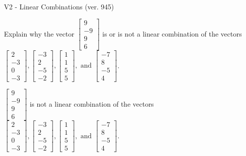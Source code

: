 \begin{exercise}
  \begin{exerciseTitle}V2 - Linear Combinations (ver. 945)\end{exerciseTitle}
  \begin{exerciseStatement}
    Explain why the vector \(\left[\begin{array}{c}
9 \\
-9 \\
9 \\
6
\end{array}\right]\)  is or is not a linear 
	combination of the vectors \(\left[\begin{array}{c}
2 \\
-3 \\
0 \\
-3
\end{array}\right] , \left[\begin{array}{c}
-3 \\
2 \\
-5 \\
-2
\end{array}\right] , \left[\begin{array}{c}
1 \\
1 \\
5 \\
5
\end{array}\right] , \text{ and } \left[\begin{array}{c}
-7 \\
8 \\
-5 \\
4
\end{array}\right]\).
	


  \end{exerciseStatement}
  \begin{exerciseAnswer}
   \(\left[\begin{array}{c}
9 \\
-9 \\
9 \\
6
\end{array}\right]\) 
  	 is not  
	a linear combination of the vectors \(\left[\begin{array}{c}
2 \\
-3 \\
0 \\
-3
\end{array}\right] , \left[\begin{array}{c}
-3 \\
2 \\
-5 \\
-2
\end{array}\right] , \left[\begin{array}{c}
1 \\
1 \\
5 \\
5
\end{array}\right] , \text{ and } \left[\begin{array}{c}
-7 \\
8 \\
-5 \\
4
\end{array}\right]\).


\end{exerciseAnswer}
\end{exercise}
